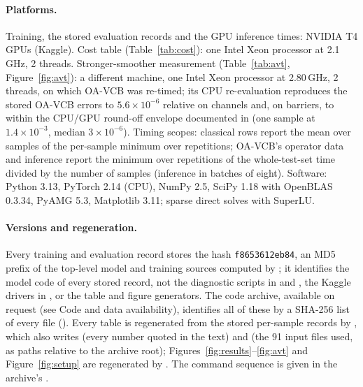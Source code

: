 \paragraph{Platforms.} Training, the stored evaluation records and the GPU inference times: NVIDIA T4 GPUs (Kaggle). Cost table
(Table~\ref{tab:cost}): one Intel Xeon processor at 2.1\,GHz, 2 threads. Stronger-smoother measurement (Table~\ref{tab:avt},
Figure~\ref{fig:avt}): a different machine, one Intel Xeon processor at 2.80\,GHz, 2 threads, on which OA-VCB was re-timed; its
CPU re-evaluation reproduces the stored OA-VCB errors to $5.6\times10^{-6}$ relative on channels and, on barriers, to within the
CPU/GPU round-off envelope documented in  (one sample at $1.4\times10^{-3}$, median $3\times10^{-6}$).
Timing scopes: classical rows report the mean over samples of the per-sample minimum over repetitions; OA-VCB's operator data
and inference report the minimum over repetitions of the whole-test-set time divided by the number of samples (inference in
batches of eight). Software: Python 3.13, PyTorch 2.14 (CPU), NumPy 2.5, SciPy 1.18 with OpenBLAS 0.3.34, PyAMG 5.3, Matplotlib
3.11; sparse direct solves with SuperLU.
\paragraph{Versions and regeneration.} Every training and evaluation record stores the hash \texttt{f8653612eb84}, an MD5
prefix of the top-level model and training sources computed by ; it identifies the model code of every
stored record, not the diagnostic scripts in  and , the Kaggle drivers in
, or the table and figure generators. The code archive, available on request (see Code and data availability), identifies all of these by a SHA-256 list of every
file (). Every table is regenerated from the stored per-sample records by ,
which also writes  (every number quoted in the text) and 
(the 91 input files used, as paths relative to the archive root); Figures~\ref{fig:results}--\ref{fig:avt} and
Figure~\ref{fig:setup} are regenerated by . The command sequence is given in the
archive's .
